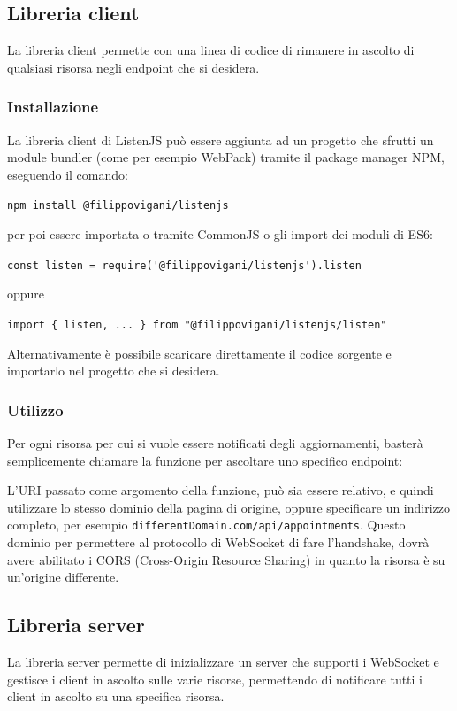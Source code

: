 \documentclass[12pt,a4paper,openright,twoside]{report}
\begin{document}
\subsection{Libreria client}
La libreria client permette con una linea di codice di rimanere in ascolto di qualsiasi risorsa negli endpoint che si desidera.

\subsubsection{Installazione}
La libreria client di ListenJS può essere aggiunta ad un progetto che sfrutti un module bundler (come per esempio WebPack) tramite il package manager NPM, eseguendo il comando:
\begin{center}
\lstinline{npm install @filippovigani/listenjs}
\end{center}
per poi essere importata o tramite CommonJS o gli import dei moduli di ES6:
\begin{center}
\lstinline{const listen = require('@filippovigani/listenjs').listen}
\end{center}
oppure
\begin{center}
\lstinline|import { listen, ... } from "@filippovigani/listenjs/listen"|
\end{center}  
Alternativamente è possibile scaricare direttamente il codice sorgente\cite{listenjs_repo} e importarlo nel progetto che si desidera.

\subsubsection{Utilizzo}
Per ogni risorsa per cui si vuole essere notificati degli aggiornamenti, basterà semplicemente chiamare la funzione per ascoltare uno specifico endpoint:

L'URI passato come argomento della funzione, può sia essere relativo, e quindi utilizzare lo stesso dominio della pagina di origine, oppure specificare un indirizzo completo, per esempio \lstinline{differentDomain.com/api/appointments}. Questo dominio per permettere al protocollo di WebSocket di fare l'handshake, dovrà avere abilitato i CORS (Cross-Origin Resource Sharing) in quanto la risorsa è su un'origine differente.

\subsection{Libreria server}
La libreria server permette di inizializzare un server che supporti i WebSocket e gestisce i client in ascolto sulle varie risorse, permettendo di notificare tutti i client in ascolto su una specifica risorsa. 
\end{document}
